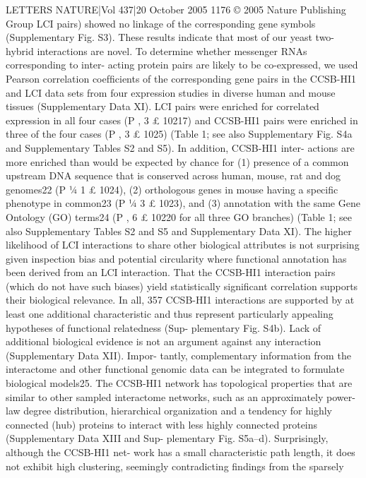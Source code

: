 LETTERS
NATURE|Vol 437|20 October 2005
1176
© 2005 Nature Publishing Group
LCI pairs) showed no linkage of the corresponding gene symbols
(Supplementary Fig. S3). These results indicate that most of our yeast
two-hybrid interactions are novel.
To determine whether messenger RNAs corresponding to inter-
acting protein pairs are likely to be co-expressed, we used Pearson
correlation coefﬁcients of the corresponding gene pairs in the
CCSB-HI1 and LCI data sets from four expression studies in diverse
human and mouse tissues (Supplementary Data XI). LCI pairs were
enriched for correlated expression in all four cases (P , 3 £ 10217)
and CCSB-HI1 pairs were enriched in three of the four cases
(P , 3 £ 1025) (Table 1; see also Supplementary Fig. S4a and
Supplementary Tables S2 and S5). In addition, CCSB-HI1 inter-
actions are more enriched than would be expected by chance for (1)
presence of a common upstream DNA sequence that is conserved
across human, mouse, rat and dog genomes22 (P ¼ 1 £ 1024), (2)
orthologous genes in mouse having a speciﬁc phenotype in common23
(P ¼ 3 £ 1023), and (3) annotation with the same Gene Ontology
(GO) terms24 (P , 6 £ 10220 for all three GO branches) (Table 1; see
also Supplementary Tables S2 and S5 and Supplementary Data XI).
The higher likelihood of LCI interactions to share other biological
attributes is not surprising given inspection bias and potential
circularity where functional annotation has been derived from an
LCI interaction. That the CCSB-HI1 interaction pairs (which do not
have such biases) yield statistically signiﬁcant correlation supports
their biological relevance. In all, 357 CCSB-HI1 interactions are
supported by at least one additional characteristic and thus represent
particularly appealing hypotheses of functional relatedness (Sup-
plementary Fig. S4b). Lack of additional biological evidence is not an
argument against any interaction (Supplementary Data XII). Impor-
tantly, complementary information from the interactome and other
functional genomic data can be integrated to formulate biological
models25.
The CCSB-HI1 network has topological properties that are similar
to other sampled interactome networks, such as an approximately
power-law degree distribution, hierarchical organization and a
tendency for highly connected (hub) proteins to interact with
less highly connected proteins (Supplementary Data XIII and Sup-
plementary Fig. S5a–d). Surprisingly, although the CCSB-HI1 net-
work has a small characteristic path length, it does not exhibit high
clustering, seemingly contradicting ﬁndings from the sparsely
